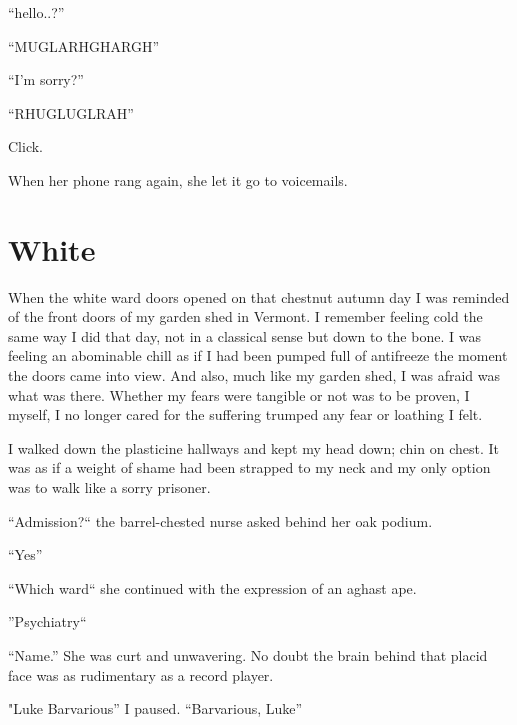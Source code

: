 ``hello..?''



``MUGLARHGHARGH''



``I'm sorry?''



``RHUGLUGLRAH''



Click.



When her phone rang again, she let it go to voicemails. 

 




\chapter{White}

When the white ward doors opened on that chestnut autumn day I was
reminded of the front doors of my garden shed in Vermont. I
remember feeling cold the same way I did that day, not in a
classical sense but down to the bone. I was feeling an abominable
chill as if I had been pumped full of antifreeze the moment the
doors came into view. And also, much like my garden shed, I was
afraid was what was there. Whether my fears were tangible or not
was to be proven, I myself, I no longer cared for the suffering
trumped any fear or loathing I felt.



I walked down the plasticine hallways and kept my head down; chin
on chest. It was as if a weight of shame had been strapped to my
neck and my only option was to walk like a sorry prisoner.



``Admission?`` the barrel-chested nurse asked behind her oak
podium.



``Yes''



``Which ward`` she continued with the expression of an aghast
ape.



''Psychiatry``



``Name.'' She was curt and unwavering. No doubt the brain
behind that placid face was as rudimentary as a record
player.



"Luke Barvarious'' I paused. ``Barvarious,
Luke''



